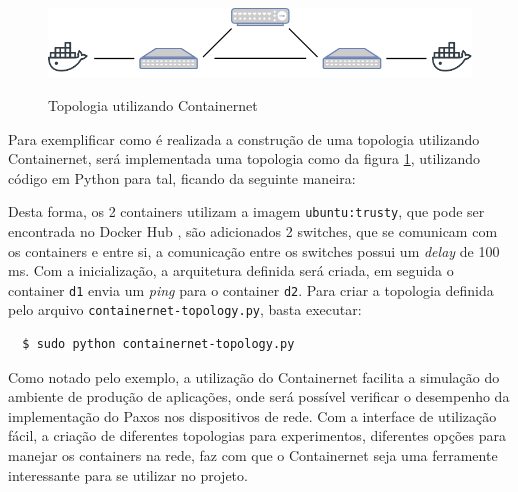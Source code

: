 \begin{figure}[h]
    \caption{Topologia utilizando Containernet}
    \centering
    \includegraphics[width=\textwidth]{images/2d-2s-1c.png}
    \label{fig:containernet-topology-example}
\end{figure}

Para exemplificar como é realizada a construção de uma topologia utilizando Containernet, será
implementada uma topologia como da figura \ref{fig:containernet-topology-example}, utilizando
código em Python para tal, ficando da seguinte maneira:



Desta forma, os 2 containers utilizam a imagem \texttt{ubuntu:trusty}, que pode ser encontrada
no Docker Hub \citep{dockerHub}, são adicionados 2 switches, que se comunicam com os
containers e entre si, a comunicação entre os switches possui um \textit{delay} de 100 ms.
Com a inicialização, a arquitetura definida será criada, em seguida o container \texttt{d1} envia um
\textit{ping} para o container \texttt{d2}. Para criar a topologia definida pelo arquivo 
\texttt{containernet-topology.py}, basta executar:

\begin{verbatim}
  $ sudo python containernet-topology.py
\end{verbatim}

Como notado pelo exemplo, a utilização do Containernet facilita a simulação do ambiente de 
produção de aplicações, onde será possível verificar o desempenho da implementação do Paxos
nos dispositivos de rede. Com a interface de utilização fácil, a criação de diferentes 
topologias para experimentos, diferentes opções para manejar os containers na rede,
faz com que o Containernet seja uma ferramente interessante para se utilizar no projeto.
